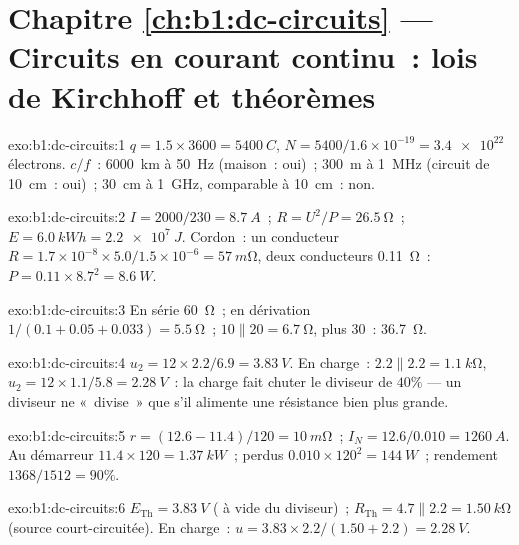 \section*{Chapitre \ref{ch:b1:dc-circuits} --- Circuits en courant continu~: lois de Kirchhoff et théorèmes}

\begin{solution}{exo:b1:dc-circuits:1}
$q = 1.5 \times 3600 = \qty{5400}{C}$, $N = 5400/1.6\times10^{-19} =
\num{3.4e22}$ électrons. $c/f$~: \qty{6000}{km} à \qty{50}{Hz} (maison~:
oui)~; \qty{300}{m} à \qty{1}{MHz} (circuit de \qty{10}{cm}~: oui)~;
\qty{30}{cm} à \qty{1}{GHz}, comparable à \qty{10}{cm}~: non.
\end{solution}

\begin{solution}{exo:b1:dc-circuits:2}
$I = 2000/230 = \qty{8.7}{A}$~; $R = U^2/P = \qty{26.5}{\ohm}$~; $E =
\qty{6.0}{kWh} = \qty{2.2e7}{J}$. Cordon~: un conducteur $R = 1.7\times10^{-8}
\times 5.0/1.5\times10^{-6} = \qty{57}{m\ohm}$, deux conducteurs
\qty{0.11}{\ohm}~: $P = 0.11 \times 8.7^2 = \qty{8.6}{W}$.
\end{solution}

\begin{solution}{exo:b1:dc-circuits:3}
En série \qty{60}{\ohm}~; en dérivation $1/(0.1 + 0.05 + 0.033) = \qty{5.5}{\ohm}$~;
$10 \parallel 20 = \qty{6.7}{\ohm}$, plus $30$~: \qty{36.7}{\ohm}.
\end{solution}

\begin{solution}{exo:b1:dc-circuits:4}
$u_2 = 12 \times 2.2/6.9 = \qty{3.83}{V}$. En charge~: $2.2 \parallel 2.2 =
\qty{1.1}{k\ohm}$, $u_2 = 12 \times 1.1/5.8 = \qty{2.28}{V}$~: la charge
fait chuter le diviseur de $40\%$ --- un diviseur ne «~divise~» que s'il
alimente une résistance bien plus grande.
\end{solution}

\begin{solution}{exo:b1:dc-circuits:5}
$r = (12.6 - 11.4)/120 = \qty{10}{m\ohm}$~; $I_N = 12.6/0.010 =
\qty{1260}{A}$. Au démarreur $11.4 \times 120 = \qty{1.37}{kW}$~; perdus
$0.010 \times 120^2 = \qty{144}{W}$~; rendement $1368/1512 = 90\%$.
\end{solution}

\begin{solution}{exo:b1:dc-circuits:6}
$E_{\mathrm{Th}} = \qty{3.83}{V}$ ( à vide du diviseur)~; $R_{\mathrm{Th}}
= 4.7 \parallel 2.2 = \qty{1.50}{k\ohm}$ (source court-circuitée). En
charge~: $u = 3.83 \times 2.2/(1.50 + 2.2) = \qty{2.28}{V}$.
\end{solution}


